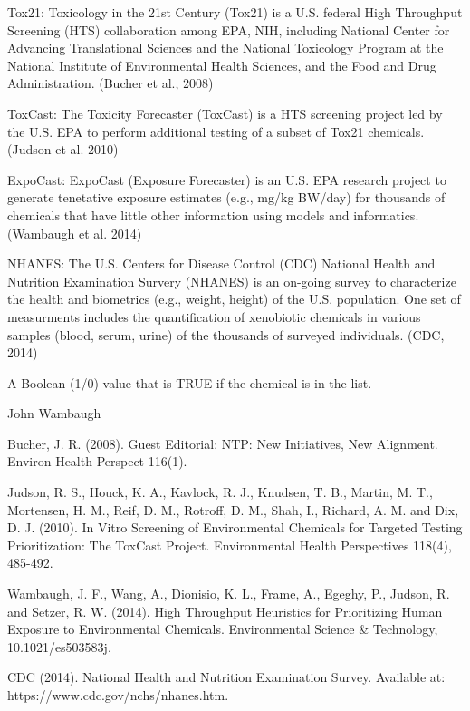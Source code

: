 \documentclass[a4paper]{book}
\begin{document}
%
\begin{Details}\relax
Tox21: Toxicology in the 21st Century (Tox21) is a U.S. federal High
Throughput Screening (HTS) collaboration among EPA, NIH, including National
Center for Advancing Translational Sciences and the National Toxicology
Program at the National Institute of Environmental Health Sciences, and the
Food and Drug Administration.  (Bucher et al., 2008)

ToxCast: The Toxicity Forecaster (ToxCast) is a HTS screening project led by
the U.S. EPA to perform additional testing of a subset of Tox21 chemicals.
(Judson et al. 2010)

ExpoCast: ExpoCast (Exposure Forecaster) is an U.S. EPA research project to
generate tenetative exposure estimates (e.g., mg/kg BW/day) for thousands of
chemicals that have little other information using models and informatics.
(Wambaugh et al. 2014)

NHANES: The U.S. Centers for Disease Control (CDC) National Health and
Nutrition Examination Survery (NHANES) is an on-going survey to characterize
the health and biometrics (e.g., weight, height) of the U.S. population. One
set of measurments includes the quantification of xenobiotic chemicals in
various samples (blood, serum, urine) of the thousands of surveyed
individuals. (CDC, 2014)
\end{Details}
%
\begin{Value}
\begin{ldescription}
\item[\code{logical}] A Boolean (1/0) value that is TRUE if the chemical is
in the list.
\end{ldescription}
\end{Value}
%
\begin{Author}\relax
John Wambaugh
\end{Author}
%
\begin{References}\relax
Bucher, J. R. (2008). Guest Editorial: NTP: New Initiatives, New
Alignment. Environ Health Perspect 116(1).

Judson, R. S., Houck, K. A., Kavlock, R. J., Knudsen, T. B., Martin, M. T.,
Mortensen, H. M., Reif, D. M., Rotroff, D. M., Shah, I., Richard, A. M. and
Dix, D. J. (2010). In Vitro Screening of Environmental Chemicals for
Targeted Testing Prioritization: The ToxCast Project. Environmental Health
Perspectives 118(4), 485-492.

Wambaugh, J. F., Wang, A., Dionisio, K. L., Frame, A., Egeghy, P., Judson,
R. and Setzer, R. W. (2014). High Throughput Heuristics for Prioritizing
Human Exposure to Environmental Chemicals. Environmental Science \&
Technology, 10.1021/es503583j.

CDC (2014). National Health and Nutrition Examination Survey. Available at:
https://www.cdc.gov/nchs/nhanes.htm.
\end{References}
\end{document}
